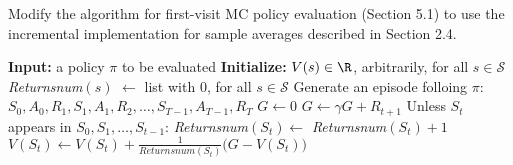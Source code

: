 
\begin{exercise}

Modify the algorithm for first-visit MC policy evaluation (Section 5.1) to use the incremental implementation for sample averages described in Section 2.4.

\end{exercise}


\begin{solution}
\phantom{}

\begin{algorithmic}[1]
  \Statex \textbf{Input:} a policy $\pi$ to be evaluated
  \Statex \textbf{Initialize:}
  \State $V(s) \in \R$, arbitrarily, for all $s \in \mathcal{S}$
  \State \textit{Returnsnum}$(s)$ $\leftarrow$ list with $0$, for all $s \in \mathcal{S}$
  \Statex
  \State Generate an episode folloing $\pi$: $S_0, A_0, R_1,S_1,A_1,R_2,\dots, S_{T-1},A_{T-1},R_T$
  \State $G \leftarrow 0$
  \State $G \leftarrow \gamma G + R_{t+1}$
  \State Unless $S_t$ appears in $S_0,S_1,\dots, S_{t-1}$:
  \State \textit{Returnsnum}$(S_t) \leftarrow$ \textit{Returnsnum}$(S_t) + 1$
  \State $V(S_t) \leftarrow V(S_t) + \frac{1}{\textit{Returnsnum}(S_t)}\big(G - V(S_t)\big)$
  \EndFor
  \EndWhile
\end{algorithmic}

\end{solution}

